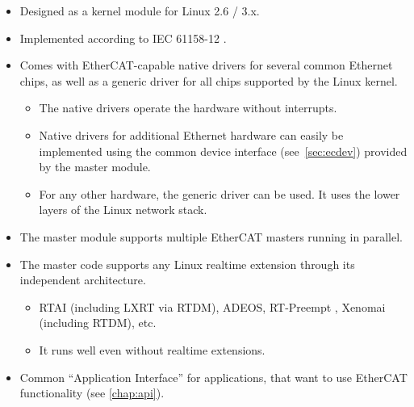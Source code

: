 \documentclass[a4paper,12pt,BCOR6mm,bibtotoc,idxtotoc]{scrbook}
\begin{document}
\begin{itemize}

\item Designed as a kernel module for Linux 2.6 / 3.x.

\item Implemented according to IEC 61158-12 \cite{dlspec} \cite{alspec}.

\item Comes with EtherCAT-capable native drivers for several common Ethernet
chips, as well as a generic driver for all chips supported by the Linux
kernel.

  \begin{itemize}

  \item The native drivers operate the hardware without interrupts.

  \item Native drivers for additional Ethernet hardware can easily be
  implemented using the common device interface (see~\autoref{sec:ecdev})
  provided by the master module.

  \item For any other hardware, the generic driver can be used. It uses the
  lower layers of the Linux network stack.

  \end{itemize}

\item The master module supports multiple EtherCAT masters running in
parallel.

\item The master code supports any Linux realtime extension through its
independent architecture.

  \begin{itemize}

  \item RTAI \cite{rtai}
  (including LXRT via RTDM), ADEOS, RT-Preempt \cite{rt-preempt}, Xenomai
  (including RTDM), etc.

  \item It runs well even without realtime extensions.

  \end{itemize}

\item Common ``Application Interface'' for applications, that want to use
EtherCAT functionality (see \autoref{chap:api}).


\end{itemize}
\end{document}
